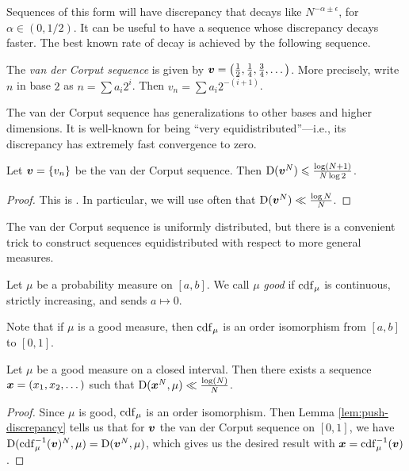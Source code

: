 Sequences of this form will have discrepancy that decays like 
$N^{-\alpha\pm \epsilon}$, for $\alpha\in (0,1/2)$. It can be useful to have a 
sequence whose discrepancy decays faster. The best known rate of decay is 
achieved by the following sequence. 

\begin{definition}
The \emph{van der Corput sequence} is given by 
${\boldsymbol v} = \left(\frac 1 2,\frac 1 4,\frac 3 4,\dots\right)$. More precisely, write 
$n$ in base $2$ as $n = \sum a_i 2^i$. Then $v_n = \sum a_i 2^{-(i+1)}$. 
\end{definition}

The van der Corput sequence has generalizations to other bases and higher 
dimensions. It is well-known for being ``very equidistributed''---i.e., its 
discrepancy has extremely fast convergence to zero. 

\begin{lemma}
Let ${\boldsymbol v}=\{v_n\}$ be the van der Corput sequence. Then
$\operatorname{D}({\boldsymbol v}^N) \leqslant \frac{\log(N+1)}{N\log 2}$. 
\end{lemma}
\begin{proof}
This is \cite[Ch.~2 Th.~3.5]{kuipers-niederreiter-1974}. In particular, we 
will use often that $\operatorname{D}({\boldsymbol v}^N)\ll \frac{\log N}{N}$. 
\end{proof}

The van der Corput sequence is uniformly distributed, but there is a 
convenient trick to construct sequences equidistributed with respect to more 
general measures. 

\begin{definition}
Let $\mu$ be a probability measure on $[a,b]$. We call $\mu$ \emph{good} if 
$\operatorname{cdf}_\mu$ is continuous, strictly increasing, and sends $a\mapsto 0$. 
\end{definition}

Note that if $\mu$ is a good measure, then $\operatorname{cdf}_\mu$ is an order isomorphism 
from $[a,b]$ to $[0,1]$. 

\begin{theorem}\label{thm:van-der-corput}
Let $\mu$ be a good measure on a closed interval. Then there exists a sequence 
${\boldsymbol x}=(x_1,x_2,\dots)$ such that $\operatorname{D}({\boldsymbol x}^N,\mu) \ll \frac{\log(N)}{N}$. 
\end{theorem}
\begin{proof}
Since $\mu$ is good, $\operatorname{cdf}_\mu$ is an order isomorphism. Then Lemma 
\ref{lem:push-discrepancy} tells us that for ${\boldsymbol v}$ the van der Corput sequence 
on $[0,1]$, we have $\operatorname{D}(\operatorname{cdf}_\mu^{-1}({\boldsymbol v})^N, \mu) = \operatorname{D}({\boldsymbol v}^N,\mu)$, 
which gives us the desired result with ${\boldsymbol x} = \operatorname{cdf}_\mu^{-1}({\boldsymbol v})$. 
\end{proof}

